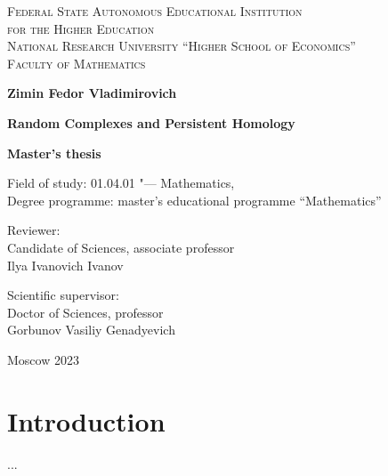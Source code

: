 \documentclass[a4paper, 12pt]{article}
\begin{document}
\begin{center}
{\scshape Federal State Autonomous Educational Institution\\
for the Higher Education\\
National Research University ``Higher School of Economics''\\[1ex]
Faculty of Mathematics\par}

\par\vfill

\textbf{\large Zimin Fedor Vladimirovich}

\vspace{1.5cm}

{\Large\bfseries
Random Complexes and Persistent Homology
\par}

\vspace{1.5cm}

\textbf{\large Master's thesis}

\vspace{1cm}

Field of study: 01.04.01 "--- Mathematics,\\[1ex]
Degree programme: master's educational programme ``Mathematics''
\par\vfill
\noindent\parbox[t]{0.48\textwidth}{%
Reviewer:\\[3pt]
Candidate of Sciences, associate professor\\
Ilya Ivanovich Ivanov 
}\hspace{0.04\textwidth}\parbox[t]{0.48\textwidth}{%
Scientific supervisor:\\[3pt]
Doctor of Sciences, professor\\
Gorbunov Vasiliy Genadyevich\\[2ex]
}%
\par\vfill\vfill
Moscow 2023
\end{center}
\thispagestyle{empty}
\pagebreak



\tableofcontents
\newpage


\section*{Introduction}
\par ...
\newpage
\end{document}
